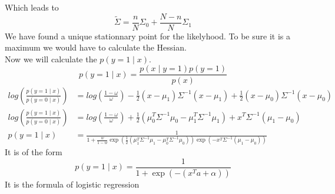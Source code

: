 \documentclass[a4paper]{article}
\begin{document}
Which leads to 
$$ \tilde{\Sigma} = \frac{n}{N}\Sigma_0 + \frac{N-n}{N}\Sigma_1 $$
We have found a unique stationnary point for the likelyhood. To be sure it is a maximum we would have to calculate the Hessian.\\
Now we will calculate the $p(y=1 \mid x)$.
$$p(y=1 \mid x) = \frac{p(x \mid y=1)p(y=1)}{p(x)}$$
\begin{align*}
log(\frac{p(y=1 \mid x)}{p(y=0 \mid x)}) &= log(\frac{1-\omega}{\omega}) - \frac{1}{2}(x - \mu_1)\Sigma^{-1}(x - \mu_1) + \frac{1}{2}(x - \mu_0)\Sigma^{-1}(x - \mu_0) \\
log(\frac{p(y=1 \mid x)}{p(y=0 \mid x)}) &= log(\frac{1-\omega}{\omega}) + \frac{1}{2}(\mu_0^T\Sigma^{-1}\mu_0 - \mu_1^T\Sigma^{-1}\mu_1) + x^T\Sigma^{-1}(\mu_1-\mu_0) \\
p(y=1 \mid x) &= \frac{1}{1+\frac{w}{1-w}\exp{(\frac{1}{2}(\mu_1^T\Sigma^{-1}\mu_1 - \mu_0^T\Sigma^{-1}\mu_0 ))}\exp{(-x^T\Sigma^{-1}(\mu_1-\mu_0))}}
\end{align*}
It is of the form
$$ p(y=1 \mid x) = \frac{1}{1+\exp{(-(x^Ta+\alpha))}} $$
It is the formula of logistic regression
\end{document}

